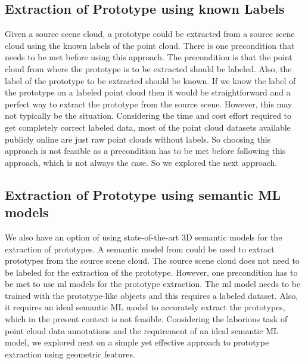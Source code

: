\subsection{Extraction of Prototype using known Labels}
Given a source scene cloud, a prototype could be extracted from a source scene cloud using the known labels of the point cloud. There is one precondition that needs to be met before using this approach. The precondition is that the point cloud from where the prototype is to be extracted should be labeled. Also, the label of the prototype to be extracted should be known. If we know the label of the prototype on a labeled point cloud then it would be straightforward and a perfect way to extract the prototype from the source scene. However, this may not typically be the situation. Considering the time and cost effort required to get completely correct labeled data, most of the point cloud datasets available publicly online are just raw point clouds without labels. So choosing this approach is not feasible as a precondition has to be met before following this approach, which is not always the case. So we explored the next approach.

\subsection{Extraction of Prototype using semantic ML models}
We also have an option of using state-of-the-art 3D semantic models for the extraction of prototypes. A semantic model from \parencite{Chen2022} could be used to extract prototypes from the source scene cloud. The source scene cloud does not need to be labeled for the extraction of the prototype. However, one precondition has to be met to use \acrfull{ml} models for the prototype extraction. The \acrshort{ml} model needs to be trained with the prototype-like objects and this requires a labeled dataset. Also, it requires an ideal semantic ML model to accurately extract the prototypes, which in the present context is not feasible. Considering the laborious task of point cloud data annotations and the requirement of an ideal semantic ML model, we explored next on a simple yet effective approach to prototype extraction using geometric features.

